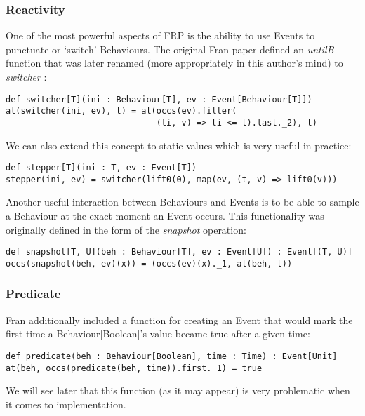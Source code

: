       \subsubsection{Reactivity}
        One of the most powerful aspects of FRP is the ability to use Events to punctuate or `switch' Behaviours.
        The original Fran paper defined an \emph{untilB} function that was later renamed (more appropriately in this
        author's mind) to \emph{switcher} \cite{Elliott2009}:

\begin{verbatim}
def switcher[T](ini : Behaviour[T], ev : Event[Behaviour[T]])
at(switcher(ini, ev), t) = at(occs(ev).filter(
                              (ti, v) => ti <= t).last._2), t)
\end{verbatim}

        We can also extend this concept to static values which is very useful in practice:
      
\begin{verbatim}  
def stepper[T](ini : T, ev : Event[T])
stepper(ini, ev) = switcher(lift0(0), map(ev, (t, v) => lift0(v)))    
\end{verbatim}

        Another useful interaction between Behaviours and Events is to be able to sample
        a Behaviour at the exact moment an Event occurs. This functionality was originally defined in the
        form of the \emph{snapshot} operation:

\begin{verbatim}
def snapshot[T, U](beh : Behaviour[T], ev : Event[U]) : Event[(T, U)]
occs(snapshot(beh, ev)(x)) = (occs(ev)(x)._1, at(beh, t))
\end{verbatim} 

    \subsubsection{Predicate}
      Fran additionally included a function for creating an Event that would mark the first
      time a Behaviour[Boolean]'s value became true after a given time:
      
\begin{verbatim}
def predicate(beh : Behaviour[Boolean], time : Time) : Event[Unit]
at(beh, occs(predicate(beh, time)).first._1) = true 
\end{verbatim}

      We will see later that this function (as it may appear) is very problematic when
      it comes to implementation.
  
